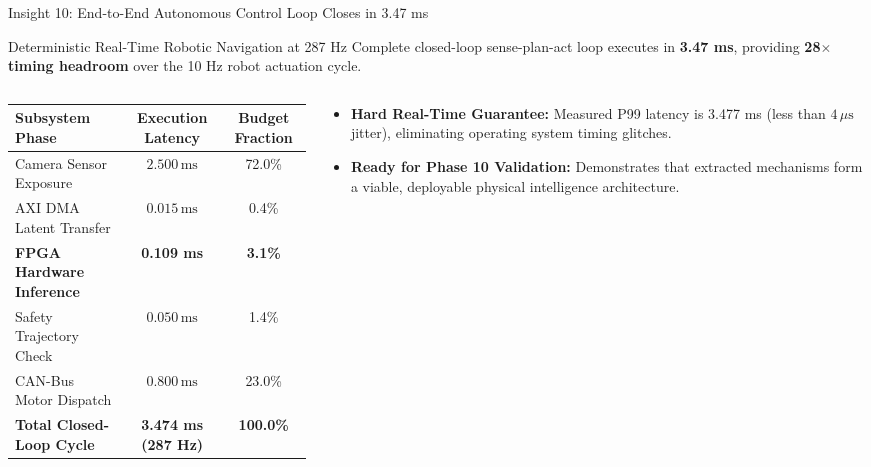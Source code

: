 \documentclass[aspectratio=169, 10pt]{beamer}
\begin{document}
\begin{frame}{Insight 10: End-to-End Autonomous Control Loop Closes in 3.47 ms}
  \begin{block}{Deterministic Real-Time Robotic Navigation at 287 Hz}
    Complete closed-loop sense-plan-act loop executes in \textbf{3.47 ms}, providing \textbf{28$\times$ timing headroom} over the 10 Hz robot actuation cycle.
  \end{block}
  \vspace{-0.2cm}
  \begin{columns}[T]
    \begin{column}{0.52\textwidth}
      \setlength{\tabcolsep}{3pt}
      \begin{table}
        \centering
        \scriptsize
        \begin{tabular}{lcc}
          \toprule
          \textbf{Subsystem Phase} & \textbf{Execution Latency} & \textbf{Budget Fraction} \\
          \midrule
          Camera Sensor Exposure & $2.500\,\text{ms}$ & 72.0\% \\
          AXI DMA Latent Transfer & $0.015\,\text{ms}$ & 0.4\% \\
          \textbf{FPGA Hardware Inference} & \textbf{0.109 ms} & \textbf{3.1\%} \\
          Safety Trajectory Check & $0.050\,\text{ms}$ & 1.4\% \\
          CAN-Bus Motor Dispatch & $0.800\,\text{ms}$ & 23.0\% \\
          \midrule
          \textbf{Total Closed-Loop Cycle} & \textbf{3.474 ms (287 Hz)} & \textbf{100.0\%} \\
          \bottomrule
        \end{tabular}
      \end{table}
    \end{column}
    \begin{column}{0.46\textwidth}
      \begin{itemize}
        \item \textbf{Hard Real-Time Guarantee:} Measured P99 latency is 3.477 ms (less than $4\,\mu\text{s}$ jitter), eliminating operating system timing glitches.
        \item \textbf{Ready for Phase 10 Validation:} Demonstrates that extracted mechanisms form a viable, deployable physical intelligence architecture.
      \end{itemize}
    \end{column}
  \end{columns}
\end{frame}
\end{document}
